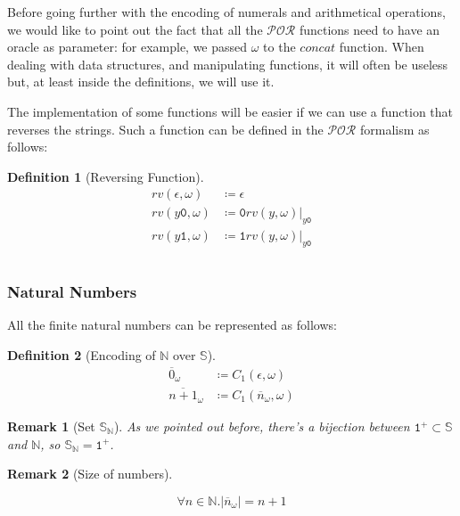 \documentclass[10pt]{amsart}
\newcommand{\POR}{\mathcal{POR}}
\newcommand{\zero}{\mathtt{0}}
\newcommand{\one}{\mathtt{1}}
\newcommand{\vtwo}{y}
\newcommand{\NN}{\mathbb{N}}
\renewcommand{\SS}{\mathbb{S}}
\newcommand{\oone}{\omega}
\newcommand{\concat}{concat}
\newcommand{\rv}{rv}
\newtheorem{defn}{Definition}
\newtheorem{remark}{Remark}
\begin{document}
Before going further with the encoding of numerals and arithmetical operations, we would like to point out the fact that all the $\POR$ functions need to have an oracle as parameter: for example, we passed $\oone$ to the $\concat$ function. When dealing with data structures, and manipulating functions, it will often be useless but, at least inside the definitions, we will use it.

The implementation of some functions will be easier if we can use a function that reverses the strings. Such a function can be defined in the $\POR$ formalism as follows:

\begin{defn}[Reversing Function]
\label{def:reversingfunction}
\begin{align*}
\rv(\epsilon, \omega) &\coloneqq \epsilon\\
\rv(\vtwo \zero, \oone) &\coloneqq \zero\rv(\vtwo, \oone)|_{\vtwo\zero}\\
\rv(\vtwo \one, \oone) &\coloneqq \one\rv(\vtwo, \oone)|_{\vtwo\zero}\\\\
\end{align*}
\end{defn}


\subsubsection{Natural Numbers}

All the finite natural numbers can be represented as follows:

\begin{defn}[Encoding of $\NN$ over $\SS$]
\begin{align*}
\overline 0_\oone &\coloneqq C_1(\epsilon, \oone)\\
\overline {n+1}_\oone &\coloneqq C_1(\overline n_\oone, \oone)
\end{align*}
\end{defn}

\begin{remark}[Set $\SS_\NN$]
\label{remark:ssnn}
As we pointed out before, there's a bijection between $\one^+\subset \SS$ and $\NN$, so $\SS_\NN= \one^+$.
\end{remark}


\begin{remark}[Size of numbers]
\label{remark:sizeofnumbers}

\[
\forall n \in \NN. |\overline n_\oone| = n+1
\]
\end{remark}
\end{document}
